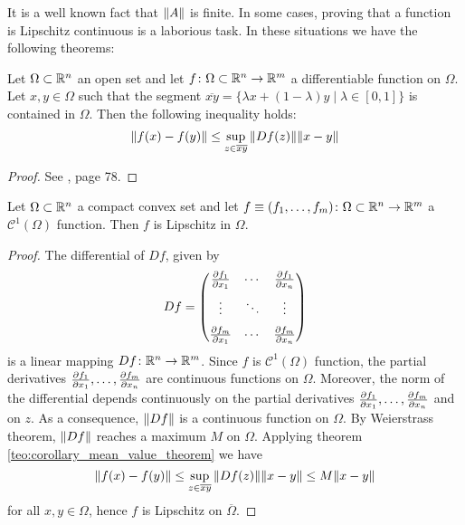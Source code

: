 \noindent
It is a well known fact that $\norm{A}$ is finite. In some cases, proving that a
function is Lipschitz continuous is a laborious task. In these situations we
have the following theorems:

\begin{theorem}
	\label{teo:corollary_mean_value_theorem} Let $\Omega \subset \mathbb{R}^n$ an
	open set and let $f \colon \Omega \subset \mathbb{R}^n \to \mathbb{R}^m$ a
	differentiable function on $\Omega$. Let $x, y \in \Omega$ such
	that the segment $\overline{xy} = \{ \lambda x + (1 -
	\lambda) y \mid \lambda \in [0, 1] \}$ is contained in $\Omega$. Then
	the following inequality holds:
	\begin{equation}
		\norm{f(x) - f(y)} \leq \sup_{z \in 
		\overline{xy}} \norm{D f(z)} \norm{x - y}
	\end{equation}
\end{theorem}
\begin{proof}
	See \cite{mazon2008calculo}, page 78.
\end{proof}

\begin{theorem} \label{teo:c1_function_implies_lipschitz} Let $\Omega \subset
	\mathbb{R}^n$ a compact convex set and let $f \equiv (f_1, \ldots, f_m) \colon
	\Omega \subset \mathbb{R}^n \to \mathbb{R}^m$ a $\mathcal{C}^1(\Omega)$ function. Then
	$f$ is Lipschitz in $\Omega$.
\end{theorem}
\begin{proof}
	The differential of $D f$, given by
	\begin{equation}
		D f = 
		\begin{pmatrix}
			\pdv{f_1}{x_1} & \cdots & \pdv{f_1}{x_n} \\[6pt]
			\vdots & \ddots & \vdots \\[6pt]
			\pdv{f_m}{x_1} & \cdots & \pdv{f_m}{x_n} \\
		\end{pmatrix}
	\end{equation}
	is a linear mapping $D f \colon \mathbb{R}^n \rightarrow \mathbb{R}^m$. Since $f$ is
	$\mathcal{C}^1(\Omega)$ function, the partial derivatives $\pdv{f_1}{x_1},
	\ldots, \pdv{f_m}{x_n}$ are continuous functions on $\Omega$. Moreover, the
	norm of the differential depends continuously on the partial derivatives
	$\pdv{f_1}{x_1}, \ldots, \pdv{f_m}{x_n}$ and on $z$. As a consequence,
	$\norm{D f}$ is a continuous function on $\Omega$. By Weierstrass theorem,
	$\norm{D f}$ reaches a maximum $M$ on $\Omega$. Applying theorem
	\ref{teo:corollary_mean_value_theorem} we have 
	\begin{equation}
		\norm{f(x) - f(y)} \leq \sup_{z \in 
		\overline{xy}} \norm{D f(z)} \norm{x - y} \leq
		M \norm{x - y}
	\end{equation}
	for all $x, y \in \Omega$, hence $f$ is Lipschitz on
	$\overline{\Omega}$.
\end{proof}

